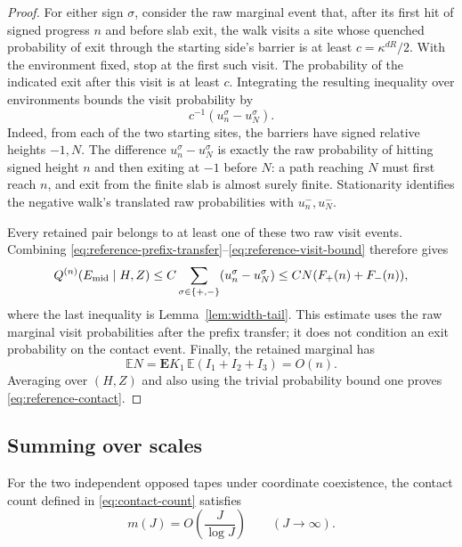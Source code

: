 \begin{proof}
For either sign \(\sigma\), consider the raw marginal event that, after
its first hit of signed progress \(n\) and before slab exit, the walk
visits a site whose quenched probability of exit through the starting
side's barrier is at least \(c=\kappa^{dR}/2\).  With the environment
fixed, stop at the first such visit.  The probability of the indicated
exit after this visit is at least \(c\).  Integrating the resulting
inequality over environments bounds the visit probability by
\begin{equation}
 c^{-1}(u_n^\sigma-u_N^\sigma).
 \label{eq:reference-visit-bound}
\end{equation}
Indeed, from each of the two starting sites, the barriers have signed
relative heights \(-1,N\).  The difference
\(u_n^\sigma-u_N^\sigma\) is exactly the raw probability of hitting
signed height \(n\) and then exiting at \(-1\) before \(N\): a path
reaching \(N\) must first reach \(n\), and exit from the finite slab is
almost surely finite.  Stationarity identifies the negative walk's
translated raw probabilities with \(u_n^-,u_N^-\).

Every retained pair belongs to at least one of these two raw visit events.
Combining \eqref{eq:reference-prefix-transfer}--\eqref{eq:reference-visit-bound}
therefore gives
\[
 Q^{(n)}(E_{\rm mid}\mid H,Z)
 \le C\sum_{\sigma\in\{+,-\}}(u_n^\sigma-u_N^\sigma)
 \le CN(F_+(n)+F_-(n)),
\]
where the last inequality is Lemma~\ref{lem:width-tail}.  This estimate
uses the raw marginal visit probabilities after the prefix transfer; it
does not condition an exit probability on the contact event.  Finally,
the retained marginal has
\[
 \mathbb E N=\mathbf E K_1\,\mathbb E(I_1+I_2+I_3)=O(n).
\]
Averaging over \((H,Z)\) and also using the trivial probability bound
one proves \eqref{eq:reference-contact}.
\end{proof}

\subsection{Summing over scales}

\begin{proposition}\label{prop:contact-upper}
For the two independent opposed tapes under coordinate coexistence, the
contact count defined in \eqref{eq:contact-count} satisfies
\begin{equation}
 m(J)=O\!\left(\frac{J}{\log J}\right)
 \qquad(J\to\infty).
 \label{eq:contact-upper}
\end{equation}
\end{proposition}

